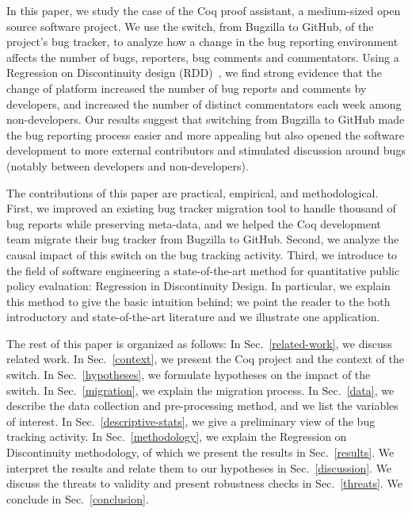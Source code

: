 \documentclass[conference]{IEEEtran}
\begin{document}
In this paper, we study the case of the Coq proof assistant, a medium-sized open source software project. We use the switch, from Bugzilla to GitHub, of the project's bug tracker, to analyze how a change in the bug reporting environment affects the number of bugs, reporters, bug comments and commentators. Using a Regression on Discontinuity design (RDD)~\cite{angrist2008mostly,angrist2014mastering,jacob2012practical,lee2010regression}, we find strong evidence that the change of platform increased the number of bug reports and comments by developers, and increased the number of distinct commentators each week among non-developers. Our results suggest that switching from Bugzilla to GitHub made the bug reporting process easier and more appealing but also opened the software development to more external contributors and stimulated discussion around bugs (notably between developers and non-developers).

The contributions of this paper are practical, empirical, and methodological. First, we improved an existing bug tracker migration tool to handle thousand of bug reports while preserving meta-data, and we helped the Coq development team migrate their bug tracker from Bugzilla to GitHub. Second, we analyze the causal impact of this switch on the bug tracking activity. Third, we introduce to the field of software engineering a state-of-the-art method for quantitative public policy evaluation: Regression in Discontinuity Design. In particular, we explain this method to give the basic intuition behind; we point the reader to the both introductory and state-of-the-art literature and we illustrate one application.

The rest of this paper is organized as follows: In Sec.~\ref{related-work}, we discuss related work. In Sec.~\ref{context}, we present the Coq project and the context of the switch. In Sec.~\ref{hypotheses}, we formulate hypotheses on the impact of the switch. In Sec.~\ref{migration}, we explain the migration process. In Sec.~\ref{data}, we describe the data collection and pre-processing method, and we list the variables of interest. In Sec.~\ref{descriptive-stats}, we give a preliminary view of the bug tracking activity. In Sec.~\ref{methodology}, we explain the Regression on Discontinuity methodology, of which we present the results in Sec.~\ref{results}. We interpret the results and relate them to our hypotheses in Sec.~\ref{discussion}. We discuss the threats to validity and  present robustness checks in Sec.~\ref{threats}. We conclude in Sec.~\ref{conclusion}.
\end{document}
